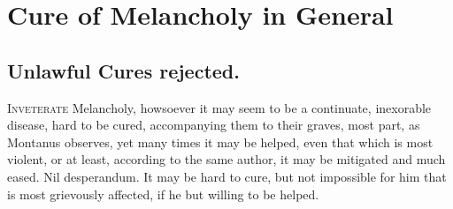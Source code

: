 \chapter{Cure of Melancholy in General}
{
\section{Unlawful Cures rejected.}
\lettrine[lines=3]{I}{nveterate} Melancholy, howsoever it may seem to be a continuate,
inexorable disease, hard to be cured, accompanying them to their
graves, most part, as Montanus observes, yet many times it may be
helped, even that which is most violent, or at least, according to the
same author, it may be mitigated and much eased. Nil desperandum.
It may be hard to cure, but not impossible for him that is most
grievously affected, if he but willing to be helped.

}
